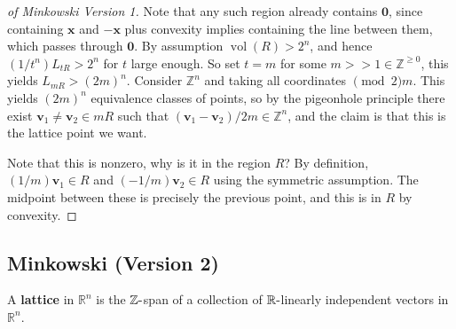 \begin{proof}[of Minkowski Version 1]

Note that any such region already contains \(\mathbf{0}\), since
containing \(\mathbf{x}\) and \(-\mathbf{x}\) plus convexity implies
containing the line between them, which passes through \(\mathbf{0}\).
By assumption \(\operatorname{vol}(R) > 2^n\), and hence
\((1/t^n)L_{tR} > 2^n\) for \(t\) large enough. So set \(t=m\) for some
\(m>> 1\in {\mathbb{Z}}^{\geq 0}\), this yields \(L_{mR} > (2m)^n\).
Consider \({\mathbb{Z}}^n\) and taking all coordinates \(\pmod 2m\).
This yields \((2m)^n\) equivalence classes of points, so by the
pigeonhole principle there exist
\(\mathbf{v}_1 \neq \mathbf{v}_2 \in mR\) such that
\((\mathbf{v}_1 - \mathbf{v}_2)/2m \in {\mathbb{Z}}^n\), and the claim
is that this is the lattice point we want.

\hfill\break

Note that this is nonzero, why is it in the region \(R\)? By definition,
\((1/m)\mathbf{v}_1 \in R\) and \((-1/m)\mathbf{v}_2 \in R\) using the
symmetric assumption. The midpoint between these is precisely the
previous point, and this is in \(R\) by convexity.

\end{proof}

\hypertarget{minkowski-version-2}{%
\subsection{Minkowski (Version 2)}\label{minkowski-version-2}}

\begin{definition}[Lattice]

A \textbf{lattice} in \({\mathbb{R}}^n\) is the
\({\mathbb{Z}}{\hbox{-}}\)span of a collection of
\({\mathbb{R}}{\hbox{-}}\)linearly independent vectors in
\({\mathbb{R}}^n\).

\end{definition}

